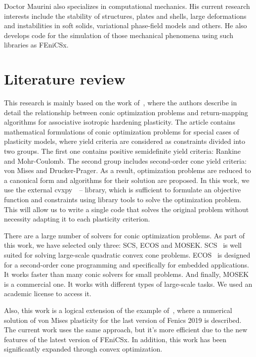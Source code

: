 \documentclass[12pt]{article}
\begin{document}
Doctor Maurini also specializes in computational mechanics. His current research interests include the stability of structures, plates and shells, large deformations and instabilities in soft solids, variational phase-field models and others. He also develops code for the simulation of those mechanical phenomena using such libraries as FEniCSx.

\newpage
\section{Literature review}

This research is mainly based on the work of~\textcite{BRUNO2020724}, where the authors describe in detail the relationship between conic optimization problems and return-mapping algorithms for associative isotropic hardening plasticity. The article contains mathematical formulations of conic optimization problems for special cases of plasticity models, where yield criteria are considered as constraints divided into two groups. The first one contains positive semidefinite yield criteria: Rankine and Mohr-Coulomb. The second group includes second-order cone yield criteria: von Mises and Drucker-Prager. As a result, optimization problems are reduced to a canonical form and algorithms for their solution are proposed. In this work, we use the external cvxpy~\parencite{diamond2016cvxpy}~--\parencite{agrawal2018rewriting} library, which is sufficient to formulate an objective function and constraints using library tools to solve the optimization problem. This will allow us to write a single code that solves the original problem without necessity adapting it to each plasticity criterion.

There are a large number of solvers for conic optimization problems. As part of this work, we have selected only three: SCS, ECOS and MOSEK. SCS~\parencite{ocpb:16} is well suited for solving large-scale quadratic convex cone problems. ECOS~\parencite{Domahidi2013ecos} is designed for a second-order cone programming and specifically for embedded applications. It works faster than many conic solvers for small problems. And finally, MOSEK~\parencite{mosek} is a commercial one. It works with different types of large-scale tasks. We used an academic license to access it.

Also, this work is a logical extension of the example of~\textcite{bleyer2018numericaltours}, where a numerical solution of von Mises plasticity for the last version of Fenics 2019 is described. The current work uses the same approach, but it's more efficient due to the new features of the latest version of FEniCSx. In addition, this work has been significantly expanded through convex optimization.
\end{document}
